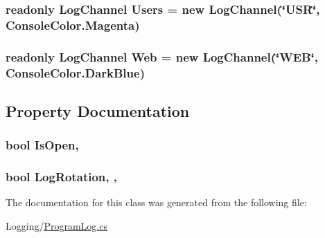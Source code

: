 \subsubsection[{Users}]{\setlength{\rightskip}{0pt plus 5cm}readonly {\bf Log\+Channel} Users = new {\bf Log\+Channel}(\char`\"{}U\+S\+R\char`\"{}, Console\+Color.\+Magenta)\hspace{0.3cm}{\ttfamily [static]}}\label{classOTA_1_1Logging_1_1ProgramLog_a314574d4ff81cf195929f1e2fa361321}
\hypertarget{classOTA_1_1Logging_1_1ProgramLog_a084c807d3562967c3d3840cc6751d8c9}{}
\subsubsection[{Web}]{\setlength{\rightskip}{0pt plus 5cm}readonly {\bf Log\+Channel} Web = new {\bf Log\+Channel}(\char`\"{}W\+E\+B\char`\"{}, Console\+Color.\+Dark\+Blue)\hspace{0.3cm}{\ttfamily [static]}}\label{classOTA_1_1Logging_1_1ProgramLog_a084c807d3562967c3d3840cc6751d8c9}


\subsection{Property Documentation}
\hypertarget{classOTA_1_1Logging_1_1ProgramLog_a28fda5085a47ebfb4b99da301c6632da}{}
\subsubsection[{Is\+Open}]{\setlength{\rightskip}{0pt plus 5cm}bool Is\+Open\hspace{0.3cm}{\ttfamily [static]}, {\ttfamily [get]}}\label{classOTA_1_1Logging_1_1ProgramLog_a28fda5085a47ebfb4b99da301c6632da}
\hypertarget{classOTA_1_1Logging_1_1ProgramLog_acba450ac68822bdc5453dc0d93dffc7f}{}
\subsubsection[{Log\+Rotation}]{\setlength{\rightskip}{0pt plus 5cm}bool Log\+Rotation\hspace{0.3cm}{\ttfamily [static]}, {\ttfamily [get]}, {\ttfamily [set]}}\label{classOTA_1_1Logging_1_1ProgramLog_acba450ac68822bdc5453dc0d93dffc7f}


The documentation for this class was generated from the following file\+:\begin{DoxyCompactItemize}
\item 
Logging/\hyperlink{ProgramLog_8cs}{Program\+Log.\+cs}\end{DoxyCompactItemize}

